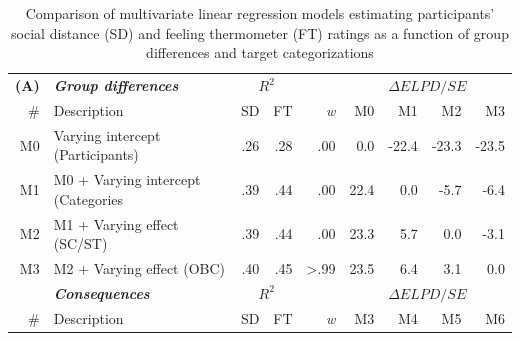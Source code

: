 \documentclass[12pt, a4paper]{article}
\begin{document}
\begin{table}
\caption{Comparison of multivariate linear regression models estimating participants’ social distance (SD) and feeling thermometer (FT) ratings as a function of group differences and target categorizations}
\centering
{}
\small
\begin{tabularx}{\linewidth}{rXr@{~}rrr@{~}r@{~}r@{~}r} \toprule
\multicolumn{1}{c}{\textbf{(A)}} & \textit{\textbf{Group differences}} & \multicolumn{2}{c}{$R^2$} & \multicolumn{1}{l}{} & \multicolumn{4}{c}{$\Delta\textit{ELPD}/\textit{SE}$}                                                                                    \\ \cmidrule{6-9}
\#                               & Description                         & SD             & FT             & \textit{w}           & M0                          & M1                           & M2                           & M3                           \\ \midrule
M0                               & Varying intercept (Participants)    & .26            & .28            & .00                  & {\color[HTML]{E0E0E0} 0.0}  & {\color[HTML]{B2182B} -22.4} & {\color[HTML]{B2182B} -23.3} & {\color[HTML]{B2182B} -23.5} \\
M1                               & M0 + Varying intercept (Categories  & .39            & .44            & .00                  & {\color[HTML]{2166AC} 22.4} & {\color[HTML]{E0E0E0} 0.0}   & {\color[HTML]{B2182B} -5.7}  & {\color[HTML]{B2182B} -6.4}  \\
M2                               & M1 + Varying effect (SC/ST)         & .39            & .44            & .00                  & {\color[HTML]{2166AC} 23.3} & {\color[HTML]{2166AC} 5.7}   & {\color[HTML]{E0E0E0} 0.0}   & {\color[HTML]{D6604D} -3.1}  \\
M3                               & M2 + Varying effect (OBC)           & .40            & .45            & \textgreater .99     & {\color[HTML]{2166AC} 23.5} & {\color[HTML]{2166AC} 6.4}   & {\color[HTML]{4393C3} 3.1}   & {\color[HTML]{E0E0E0} 0.0}   \\ \bottomrule \addlinespace \toprule
\multicolumn{1}{c}{\textbf{(B)}} & \textit{\textbf{Consequences}}      & \multicolumn{2}{c}{$R^2$} & \multicolumn{1}{l}{} & \multicolumn{4}{c}{$\Delta\textit{ELPD}/\textit{SE}$}                                                                                    \\ \cmidrule{6-9}
\#                               & Description                         & SD             & FT             & \textit{w}           & M3                          & M4                           & M5                           & M6                           \\ \midrule

\end{tabularx}
\end{table}
\end{document}
